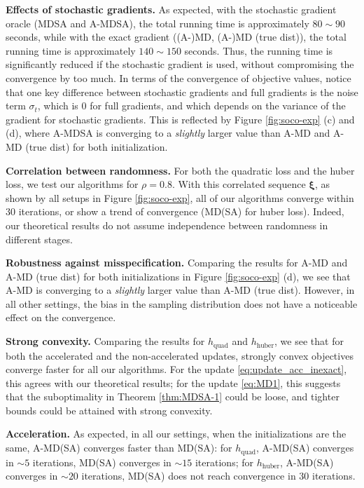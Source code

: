 \documentclass[11pt,fullpage,letterpaper]{article}
\newcommand{\bx}{\boldsymbol{\xi}}
\begin{document}
\textbf{Effects of stochastic gradients.} 
As expected, with the stochastic gradient oracle (MDSA and A-MDSA), the total running time is approximately $ 80\sim 90$ seconds, while with the exact gradient ((A-)MD, (A-)MD (true dist)), the total running time is approximately $140\sim 150$ seconds. Thus, the running time is significantly reduced if the stochastic gradient is used, without compromising the convergence by too much. In terms of the convergence of objective values, notice that one key difference between stochastic gradients and full gradients is the noise term $\sigma_t$, which is $0$ for full gradients, and which depends on the variance of the gradient for stochastic gradients. This is reflected by Figure \ref{fig:soco-exp} (c) and (d), where A-MDSA is converging to a \textit{slightly} larger value than A-MD and A-MD (true dist) for both initialization. 

\textbf{Correlation between randomness.} For both the quadratic loss and the huber loss, we test our algorithms for $\rho = 0.8$. With this correlated sequence $\bx$, as shown by all setups in Figure \ref{fig:soco-exp}, all of our algorithms converge within $30$ iterations, or show a trend of convergence (MD(SA) for huber loss). Indeed, our theoretical results do not assume independence between randomness in different stages. 


\textbf{Robustness against misspecification.} Comparing the results for A-MD and A-MD (true dist) for both initializations in Figure \ref{fig:soco-exp} (d), we see that A-MD is converging to a \textit{slightly} larger value than A-MD (true dist). However, in all other settings, the bias in the sampling distribution does not have a noticeable effect on the convergence.



\textbf{Strong convexity.} Comparing the results for $h_{\text{quad}}$ and $h_{\text{huber}}$, we see that for both the accelerated and the non-accelerated updates, strongly convex objectives converge faster for all our algorithms. For the update \eqref{eq:update_acc_inexact}, this agrees with our theoretical results; for the update \eqref{eq:MD1}, this suggests that the suboptimality in Theorem \ref{thm:MDSA-1} could be loose, and tighter bounds could be attained with strong convexity. 


\textbf{Acceleration.} As expected, in all our settings, when the initializations are the same, A-MD(SA) converges faster than MD(SA): for $h_{\text{quad}}$, A-MD(SA) converges in $\sim 5$ iterations, MD(SA) converges in $\sim 15$ iterations; for $h_{\text{huber}}$, A-MD(SA) converges in $\sim 20$ iterations, MD(SA) does not reach convergence in $30$ iterations. 
\end{document}
